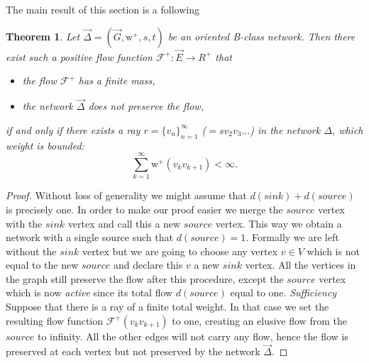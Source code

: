 \documentclass[12pt]{article}
\newtheorem{theorem}{Theorem}
\theoremstyle{definition}
\newcommand{\seq}[1]{\{{#1}_n\}_{n=1}^\infty}
\newcommand{\wtp}{\mathrm{w}^{+}}
\newcommand{\flowpos}{\mathcal{F}^{+}}
\newcommand{\source}{\mathit{source}}
\newcommand{\sink}{\mathit{sink}}
\newcommand{\net}{\Delta}
\newcommand{\onet}{\vec{\Delta}}
\numberwithin{remark}{section}
\numberwithin{theorem}{section}
\numberwithin{prop}{section}
\numberwithin{equation}{section}
\numberwithin{lemma}{section}
\numberwithin{prop_under_lemma}{lemma}
\begin{document}
    The main result of this section is a following
    \begin{theorem}
      Let $\onet = (\vec{G}, \wtp, s, t)$ be an oriented B-class network.
      Then there exist such a positive flow function $\flowpos: \vec{E} \to R^{+}$ that
      \begin{itemize}
        \item the flow $\flowpos$ has a finite mass,
        \item the network $\onet$ does not preserve the flow,
      \end{itemize}
        if and only if there exists a ray $r = \seq{v}$ ($=sv_2v_3\dots$)
        in the network $\net$, which weight is bounded:
        $$
          \sum_{k=1}^\infty \wtp(v_k v_{k+1}) < \infty.
        $$
    \end{theorem}
    \begin{proof}
      Without loss of generality we might assume that $d(\sink) + d(\source)$ is precisely one.
      In order to make our proof easier we merge the $\source$ vertex with the $\sink$ vertex and call this a
        new $\source$ vertex.
      This way we obtain a network with a single source such that $d(\source) = 1$.
      Formally we are left without the $\sink$ vertex but we are going to choose any vertex $v \in V$ which
        is not equal to the new $\source$ and declare this $v$ a new $\sink$ vertex.
      All the vertices in the graph still preserve the flow after this procedure, except the $\source$ vertex
        which is now \emph{active} since its total flow $d(\source)$ equal to one.
      \noindent\textit{Sufficiency}
      Suppose that there is a ray of a finite total weight. 
      In that case we set the resulting flow function $\flowpos(v_k v_{k+1})$ to one, creating an elusive flow
        from the $\source$ to infinity. All the other edges will not carry any flow, hence the flow is preserved
        at each vertex but not preserved by the network $\onet$.


\end{proof}
\end{document}
